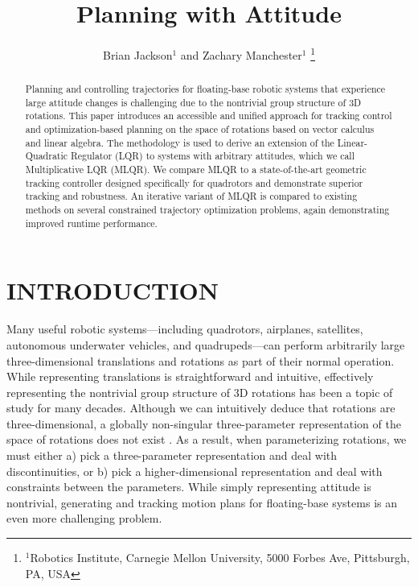 \documentclass[letterpaper, 10 pt, conference]{ieeeconf}  %
\title{\LARGE \bf
Planning with Attitude
}
\author{Brian Jackson$^1$ and Zachary Manchester$^1$%
    \thanks{
        $^1$Robotics Institute, 
        Carnegie Mellon University, 
        5000 Forbes Ave, Pittsburgh, PA, USA
    }
}
\begin{document}
\maketitle

\begin{abstract}
Planning and controlling trajectories for floating-base robotic systems that experience
large attitude changes is challenging due to the nontrivial group structure of 3D
rotations. This paper introduces an accessible and unified approach for tracking control
and optimization-based planning on the space of rotations based on vector calculus and
linear algebra. The methodology is used to derive an extension of the Linear-Quadratic
Regulator (LQR) to systems with arbitrary attitudes, which we call Multiplicative LQR
(MLQR). We compare MLQR to a state-of-the-art geometric tracking controller designed
specifically for quadrotors and demonstrate superior tracking and robustness. An
iterative variant of MLQR is compared to existing methods on several constrained
trajectory optimization problems, again demonstrating improved runtime performance. 
\end{abstract}

\section{INTRODUCTION}

    Many useful robotic systems---including quadrotors, airplanes, satellites, autonomous
    underwater vehicles, and quadrupeds---can perform arbitrarily large three-dimensional
    translations and rotations as part of their normal operation. While representing
    translations is straightforward and intuitive, effectively representing the
    nontrivial group structure of 3D rotations has been a topic of study for many
    decades. Although we can intuitively deduce that rotations are three-dimensional, a
    globally non-singular three-parameter representation of the space of rotations does
    not exist \cite{stuelpnagel1964parametrization}. As a result, when parameterizing
    rotations, we must either a) pick a three-parameter representation and deal with
    discontinuities, or b) pick a higher-dimensional representation and deal with
    constraints between the parameters. While simply representing attitude is nontrivial,
    generating and tracking motion plans for floating-base systems is an even more
    challenging problem.
\end{document}
